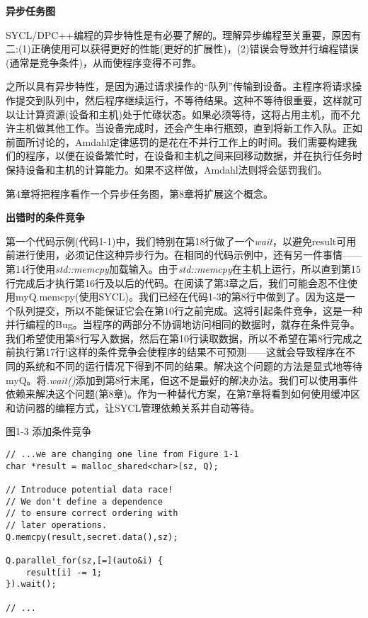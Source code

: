 \hspace*{\fill} \par %
\textbf{异步任务图}

SYCL/DPC++编程的异步特性是有必要了解的。理解异步编程至关重要，原因有二:(1)正确使用可以获得更好的性能(更好的扩展性)，(2)错误会导致并行编程错误(通常是竞争条件)，从而使程序变得不可靠。\par

之所以具有异步特性，是因为通过请求操作的“队列”传输到设备。主程序将请求操作提交到队列中，然后程序继续运行，不等待结果。这种不等待很重要，这样就可以让计算资源(设备和主机)处于忙碌状态。如果必须等待，这将占用主机，而不允许主机做其他工作。当设备完成时，还会产生串行瓶颈，直到将新工作入队。正如前面所讨论的，Amdahl定律惩罚的是花在不并行工作上的时间。我们需要构建我们的程序，以便在设备繁忙时，在设备和主机之间来回移动数据，并在执行任务时保持设备和主机的计算能力。如果不这样做，Amdahl法则将会惩罚我们。\par

第4章将把程序看作一个异步任务图，第8章将扩展这个概念。\par

\hspace*{\fill} \par %
\textbf{出错时的条件竞争}

第一个代码示例(代码1-1)中，我们特别在第18行做了一个\textit{wait}，以避免result可用前进行使用，必须记住这种异步行为。在相同的代码示例中，还有另一件事情——第14行使用\textit{std::memcpy}加载输入。由于\textit{std::memcpy}在主机上运行，所以直到第15行完成后才执行第16行及以后的代码。在阅读了第3章之后，我们可能会忍不住使用myQ.memcpy(使用SYCL)。我们已经在代码1-3的第8行中做到了。因为这是一个队列提交，所以不能保证它会在第10行之前完成。这将引起条件竞争，这是一种并行编程的Bug。当程序的两部分不协调地访问相同的数据时，就存在条件竞争。我们希望使用第8行写入数据，然后在第10行读取数据，所以不希望在第8行完成之前执行第17行!这样的条件竞争会使程序的结果不可预测——这就会导致程序在不同的系统和不同的运行情况下得到不同的结果。解决这个问题的方法是显式地等待myQ。将\textit{.wait()}添加到第8行末尾，但这不是最好的解决办法。我们可以使用事件依赖来解决这个问题(第8章)。作为一种替代方案，在第7章将看到如何使用缓冲区和访问器的编程方式，让SYCL管理依赖关系并自动等待。\par

图1-3 添加条件竞争
\begin{lstlisting}[caption={}]
// ...we are changing one line from Figure 1-1
char *result = malloc_shared<char>(sz, Q);

// Introduce potential data race!
// We don't define a dependence
// to ensure correct ordering with
// later operations.
Q.memcpy(result,secret.data(),sz);

Q.parallel_for(sz,[=](auto&i) {
	result[i] -= 1;
}).wait();

// ...
\end{lstlisting}

